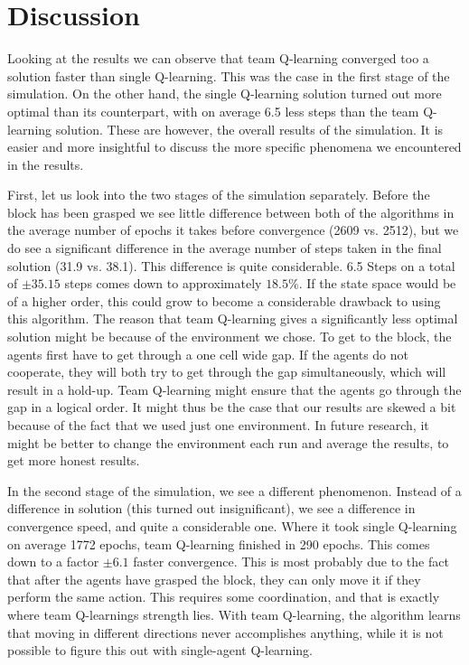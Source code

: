 \section{Discussion}
Looking at the results we can observe that team Q-learning converged too a solution faster than single Q-learning. This was the case in the first stage of the simulation. On the other hand, the single Q-learning solution turned out more optimal than its counterpart, with on average 6.5 less steps than the team Q-learning solution. These are however, the overall results of the simulation. It is easier and more insightful to discuss the more specific phenomena we encountered in the results.

First, let us look into the two stages of the simulation separately. Before the block has been grasped we see little difference between both of the algorithms in the average number of epochs it takes before convergence (2609 vs. 2512), but we do see a significant difference in the average number of steps taken in the final solution (31.9 vs. 38.1). This difference is quite considerable. 6.5 Steps on a total of $\pm 35.15$ steps comes down to approximately $18.5\%$. If the state space would be of a higher order, this could grow to become a considerable drawback to using this algorithm. The reason that team Q-learning gives a significantly less optimal solution might be because of the environment we chose. To get to the block, the agents first have to get through a one cell wide gap. If the agents do not cooperate, they will both try to get through the gap simultaneously, which will result in a hold-up. Team Q-learning might ensure that the agents go through the gap in a logical order. It might thus be the case that our results are skewed a bit because of the fact that we used just one environment. In future research, it might be better to change the environment each run and average the results, to get more honest results.

In the second stage of the simulation, we see a different phenomenon. Instead of a difference in solution (this turned out insignificant), we see a difference in convergence speed, and quite a considerable one. Where it took single Q-learning on average 1772 epochs, team Q-learning finished in 290 epochs. This comes down to a factor $\pm 6.1$ faster convergence. This is most probably due to the fact that after the agents have grasped the block, they can only move it if they perform the same action. This requires some coordination, and that is exactly where team Q-learnings strength lies. With team Q-learning, the algorithm learns that moving in different directions never accomplishes anything, while it is not possible to figure this out with single-agent Q-learning.

